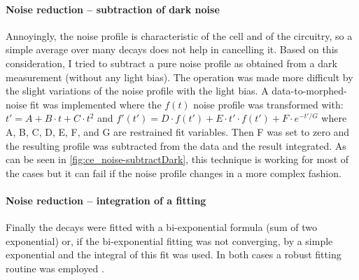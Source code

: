 	\paragraph{Noise reduction -- subtraction of dark noise} Annoyingly, the noise profile is characteristic of the cell and of the circuitry, so a simple average over many decays does not help in cancelling it. Based on this consideration, I tried to subtract a pure noise profile as obtained from a dark measurement (without any light bias). The operation was made more difficult by the slight variations of the noise profile with the light bias. A data-to-morphed-noise fit was implemented where the $f(t)$ noise profile was transformed with:$t'= A + B \cdot t + C \cdot t^2$ and $f'(t') = D \cdot f(t') + E \cdot t' \cdot f(t') + F \cdot e^{-t'/G}$ where A, B, C, D, E, F, and G are restrained fit variables. Then F was set to zero and the resulting profile was subtracted from the data and the result integrated. As can be seen in \cref{fig:ce_noise-subtractDark}, this technique is working for most of the cases but it can fail if the noise profile changes in a more complex fashion.
	
	
	\paragraph{Noise reduction -- integration of a fitting} Finally the decays were fitted with a bi-exponential formula (sum of two exponential) or, if the bi-exponential fitting was not converging, by a simple exponential and the integral of this fit was used. In both cases a robust fitting routine was employed \cite{Maechler2018}.
	
